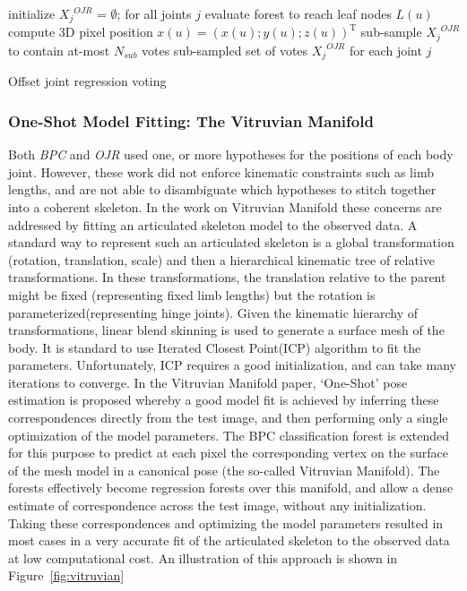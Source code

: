 \begin{algorithm}
 initialize ${X_j}^{OJR}$ = $\emptyset$; for all joints $j$ \;
  { 
   evaluate forest to reach leaf nodes $L(u)$ \;
   compute 3D pixel position $x(u) = (x(u); y(u); z(u))^\text{T}$ \;
  }
  sub-sample ${X_j}^{OJR}$ to contain at-most $N_{sub}$ votes \;
  \Return sub-sampled set of votes ${X_j}^{OJR}$ for each joint $j$ \;
 \caption{Offset joint regression voting}
 \label{alg:ojr}
\end{algorithm}

\subsubsection{One-Shot Model Fitting: The Vitruvian Manifold}
	Both \emph{BPC} and \emph{OJR} used one, or more hypotheses for the positions of each body joint. However, these work did not enforce kinematic constraints such as limb lengths, and are not able to disambiguate which hypotheses to stitch together into a coherent skeleton. In the work on Vitruvian Manifold \cite{taylor2012vitruvian} these concerns are addressed by fitting an articulated skeleton model to the observed data. A standard way to represent such an articulated skeleton is a global transformation (rotation, translation, scale) and then a hierarchical kinematic tree of relative transformations. In these transformations, the translation relative to the parent might be fixed (representing fixed limb lengths) but the rotation is parameterized(representing hinge joints). Given the kinematic hierarchy of transformations, linear blend skinning is used to generate a surface mesh of the body. It is standard to use Iterated Closest Point(ICP) algorithm to fit the parameters. Unfortunately, ICP requires a good initialization, and can take many iterations to converge. In the Vitruvian Manifold paper\cite{taylor2012vitruvian}, ‘One-Shot’ pose estimation is proposed whereby a good model fit is achieved by inferring these correspondences directly from the test image, and then performing only a single optimization of the model parameters. The BPC classification forest is extended for this purpose to predict at each pixel the corresponding vertex on the surface of the mesh model in a canonical pose (the so-called Vitruvian Manifold). The forests effectively become regression forests over this manifold, and allow a dense estimate of correspondence across the test image, without any initialization. Taking these correspondences and optimizing the model parameters resulted in most cases in a very accurate fit of the articulated skeleton to the observed data at low computational cost. An illustration of this approach is shown in Figure~\ref{fig:vitruvian}

